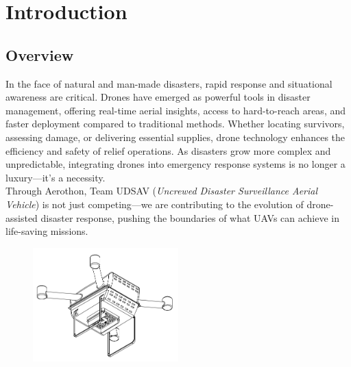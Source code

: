 \documentclass[12pt]{report}
\begin{document}
  \tableofcontents
  \newpage
\begingroup
  \let\clearpage\relax
  \listoftables
  \vspace{1in}
  \listoffigures
\endgroup
  \newpage

  \renewcommand{\arraystretch}{1.5}

  \chapter{Introduction}
  \section{Overview}

   In the face of natural and man-made disasters, rapid response and situational awareness are critical. Drones have emerged as powerful tools in disaster management, offering real-time aerial insights, access to hard-to-reach areas, and faster deployment compared to traditional methods. Whether locating survivors, assessing damage, or delivering essential supplies, drone technology enhances the efficiency and safety of relief operations. As disasters grow more complex and unpredictable, integrating drones into emergency response systems is no longer a luxury—it's a necessity. \\ 

   Through Aerothon, Team UDSAV (\textit{Uncrewed Disaster Surveillance Aerial Vehicle}) is not just competing—we are contributing to the evolution of drone-assisted disaster response, pushing the boundaries of what UAVs can achieve in life-saving missions.
   \begin{figure}[h]
        \centering
        \includegraphics[width=0.5\textwidth]{droneschematic2d.png}
        \label{fig:udsav}
      \end{figure}
\end{document}
